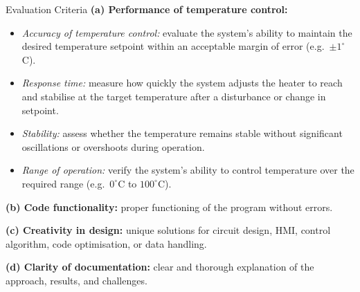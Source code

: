 \begin{labsection}{Evaluation Criteria}
  \textbf{(a) Performance of temperature control:}
  \begin{itemize}
    \item \textit{Accuracy of temperature control:} evaluate the system's ability to maintain the desired temperature setpoint within an acceptable margin of error (e.g.\ $\pm 1^\circ$C).
    \item \textit{Response time:} measure how quickly the system adjusts the heater to reach and stabilise at the target temperature after a disturbance or change in setpoint.
    \item \textit{Stability:} assess whether the temperature remains stable without significant oscillations or overshoots during operation.
    \item \textit{Range of operation:} verify the system's ability to control temperature over the required range (e.g.\ $0^\circ$C to $100^\circ$C).
  \end{itemize}
  \textbf{(b) Code functionality:} proper functioning of the program without errors.
  \vspace*{0.5em}

  \textbf{(c) Creativity in design:} unique solutions for circuit design, HMI, control algorithm, code optimisation, or data handling.
  \vspace*{0.5em}

  \textbf{(d) Clarity of documentation:} clear and thorough explanation of the approach, results, and challenges.
\end{labsection}
